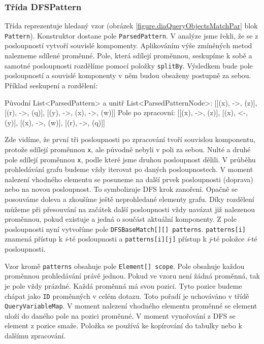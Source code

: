 \subsubsection{Třída DFSPattern}

Třída reprezentuje hledaný vzor (obrázek \ref{figure.diaQueryObjectsMatchPar} blok \texttt{Pattern}).
Konstruktor dostane pole \texttt{ParsedPattern}.
V analýze jsme řekli, že se z posloupností vytvoří souvislé kompomenty.
Aplikováním výše zmíněných metod nalezneme sdílené proměnné.
Pole, která sdílejí proměnnou, seskupíme k sobě a samotné posloupnosti rozdělíme pomocí položky \texttt{splitBy}.
Výsledkem bude pole posloupností a souvislé komponenty v něm budou obsaženy postupně za sebou.
Příklad seskupení a rozdělení:
\begin{code}
Původní List<ParsedPattern> a unitř List<ParsedPatternNode>:
[[(x), ->, (z)], [(r), ->, (q)], [(y), ->, (x), ->, (w)]]
Pole po zpracovní:
[[(x), ->, (z)], [(x), <-, (y)], [(x), ->, (w)], [(r), ->, (q)]]
\end{code}
Zde vidíme, že první tři posloupnosti po zpracování tvoří souvislou komponentu, protože sdílejí proměnnou \texttt{x}, ale původně nebyli v poli za sebou.
Nulté a druhé pole sdílejí proměnnou \texttt{x}, podle které jsme druhou posloupnost dělili.
V průběhu prohledávání grafu budeme vždy iterovat po daných posloupnostech.
V moment nalezení vhodného elementu se posuneme na další prvek posloupnosti (doprava) nebo na novou posloupnost.
To symbolizuje DFS krok zanoření.
Opačně se posouváme doleva a zkoušíme ještě neprohledané elementy grafu.
Díky rozdělení můžeme při přesouvání na začátek další posloupnosti vždy navázat již nalezenou proměnnou, pokud existuje a jedná o součást aktuální komponenty.
Z pole posloupnosti nyní vytvoříme pole \texttt{DFSBaseMatch[][] patterns}.
\texttt{patterns[i]} znamená přístup k \textit{i}-té posloupnosti a \texttt{patterns[i][j]} přístup k \textit{j}-té položce  \textit{i}-té posloupnosti. 

Vzor kromě \texttt{patterns} obsahuje pole \texttt{Element[] scope}.
Pole obsahuje každou proměnnou prohledávání právě jednou. 
Pokud ve vzoru není žádná proměnná, tak je pole vždy prázdné.
Každá proměnná má svou pozici.
Tyto pozice budeme chápat jako \texttt{ID} proměnných v celém dotazu.
Toto pořadí je uchováváno v třídě \texttt{QueryVariableMap}.
V moment nalezení vhodného elementu proměnné se element uloží do daného pole na pozici proměnné.
V moment vynořování z DFS se element z pozice smaže.
Položka se používá ke kopírování do tabulky nebo k dalšímu zpracování.

